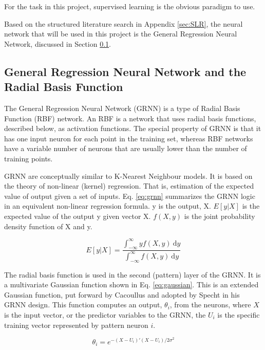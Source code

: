 \documentclass[12pt]{article}
\begin{document}
	For the task in this project, supervised learning is the obvious paradigm to use.
	
	Based on the structured literature search in Appendix \ref{sec:SLR}, the neural network that will be used in this project is the General Regression Neural Network, discussed in Section \ref{sec:grnn}.
	
	\subsection{General Regression Neural Network and the Radial Basis Function}
		\label{sec:grnn}
		The General Regression Neural Network (GRNN)\cite{grnn} is a type of Radial Basis Function (RBF) network. An RBF is a network that uses radial basis functions, described below, as activation functions. The special property of GRNN is that it has one input neuron for each point in the training set, whereas RBF networks have a variable number of neurons that are usually lower than the number of training points.

		GRNN are conceptually similar to K-Nearest Neighbour models. It is based on the theory of non-linear (kernel) regression. That is, estimation of the expected value of output given a set of inputs. Eq. \ref{eq:grnn} summarizes the GRNN logic in an equivalent non-linear regression formula. y is the output, X. $E[y|X]$ is the expected value of the output y given vector X. $f(X, y)$ is the joint probability density function of X and y.
		
		\begin{equation}
			\label{eq:grnn}
			E[y|X] = \frac{\int_{-\infty}^{\infty}yf(X,y)\:\mathrm{d}y}{\int_{-\infty}^{\infty}f(X,y)\:\mathrm{d}y}
		\end{equation}
		
		
		The radial basis function is used in the second (pattern) layer of the GRNN. It is a multivariate Gaussian function shown in Eq. \ref{eq:gaussian}. This is an extended Gaussian function, put forward by Cacoullus\cite{cacoullos} and adopted by Specht\cite{grnn} in his GRNN design\cite{grnn2}. This function computes an output, $\theta_{i}$, from the neurons, where $X$ is the input vector, or the predictor variables to the GRNN, the $U_{i}$ is the specific training vector represented by pattern neuron $i$.
		
		\begin{equation}
			\label{eq:gaussian}
			\theta_{i} = e^{-(X-U_{i})'(X-U_{i})/2\sigma^{2}}
		\end{equation}
				
\end{document}
